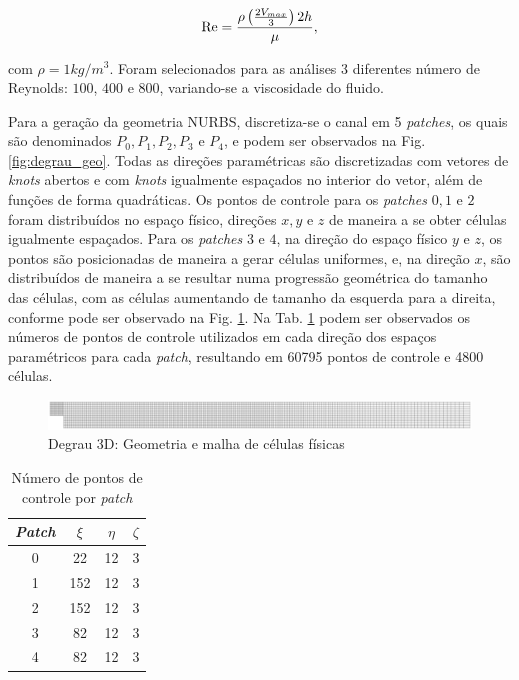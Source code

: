 \documentclass[tese_patricia]{subfiles}
\begin{document}
\begin{align}
\mathrm{Re} =\frac{\rho\left(\frac{2V_{max}}{3}\right)2h}{\mu},
\end{align}

\noindent com $\rho = 1kg/m^{3}$. Foram selecionados para as análises 3 diferentes número de Reynolds: $100$, $400$ e $800$, variando-se a viscosidade do fluido.

Para a geração da geometria NURBS, discretiza-se o canal em 5 \textit{patches}, os quais são denominados $P_{0},P_{1},P_{2},P_{3}$ e $P_{4}$, e podem ser observados na Fig. \ref{fig:degrau_geo}. Todas as direções paramétricas são discretizadas com vetores de \textit{knots} abertos e com \textit{knots} igualmente espaçados no interior do vetor, além de funções de forma quadráticas. Os pontos de controle para os \textit{patches} $0,1$ e $2$ foram distribuídos no espaço físico, direções $x,y$ e $z$ de maneira a se obter células igualmente espaçados. Para os \textit{patches} $3$ e $4$, na direção do espaço físico $y$ e $z$, os pontos são posicionadas de maneira a gerar células uniformes, e, na direção $x$, são distribuídos de maneira a se resultar numa progressão geométrica do tamanho das células, com as células aumentando de tamanho da esquerda para a direita, conforme pode ser observado na Fig. \ref{fig:degrau_malha}. Na Tab. \ref{tab:numberPCpatches} podem ser observados os números de pontos de controle utilizados em cada direção dos espaços paramétricos para cada \textit{patch}, resultando em 60795 pontos de controle e 4800 células.

\begin{figure}[htb!]
	\centering
	\includegraphics[scale=0.3,trim=1cm 14cm 1cm 14cm, clip=true]{Imagens/Cap2/malhadegrau.eps}
	\caption{Degrau 3D: Geometria e malha de células físicas}
	\label{fig:degrau_malha}
\end{figure}

\begin{center}
	\begin{table}[h!]
		\caption{Número de pontos de controle por \textit{patch}}
		\centering
		\begin{tabular}{|c | c | c| c|} 
			\hline
			\textit{Patch} & $\xi$ & $\eta$ & $\zeta$ \\ 
			\hline
			0 & 22 & 12 & 3 \\ 
			\hline
			1 & 152 & 12 & 3\\
			\hline
			2 & 152 & 12 & 3\\
			\hline
			3 & 82 & 12 & 3\\
			\hline
			4 & 82 & 12 & 3\\
			\hline
		\end{tabular}
		\label{tab:numberPCpatches}
	\end{table}
\end{center}
\end{document}
